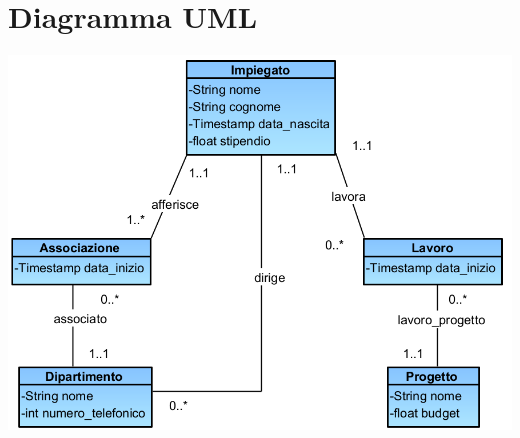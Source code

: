 \documentclass[12pt, letterpaper]{article}
\begin{document}
\section{Diagramma UML}
\begin{center}
    \includegraphics[width=1\textwidth ]{images/UML_visualParadigm.png}
\end{center}
\end{document}
